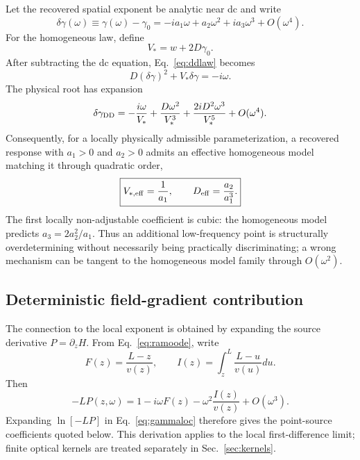 \documentclass[aps,pra,twocolumn,superscriptaddress,nofootinbib]{revtex4-2}
\newcommand{\Deff}{D_{\mathrm{eff}}}
\begin{document}
Let the recovered spatial exponent be analytic near dc and write
\begin{equation}
\delta\gamma(\omega)
\equiv\gamma(\omega)-\gamma_0
=-ia_1\omega+a_2\omega^2+ia_3\omega^3+O(\omega^4).
\label{eq:gammaexpansion}
\end{equation}
For the homogeneous law, define
\begin{equation}
V_*=w+2D\gamma_0.
\end{equation}
After subtracting the dc equation, Eq.~\eqref{eq:ddlaw} becomes
\begin{equation}
D(\delta\gamma)^2+V_*\delta\gamma=-i\omega.
\end{equation}
The physical root has expansion
\begin{equation}
\delta\gamma_{\rm DD}
=-\frac{i\omega}{V_*}
+\frac{D\omega^2}{V_*^3}
+\frac{2iD^2\omega^3}{V_*^5}
+O(\omega^4).
\label{eq:ddexpansion}
\end{equation}
Consequently, for a locally physically admissible parameterization, a recovered response with $a_1>0$ and $a_2>0$ admits an effective homogeneous model matching it through quadratic order,
\begin{equation}
\boxed{
V_{*,\rm eff}=\frac{1}{a_1},
\qquad
\Deff=\frac{a_2}{a_1^3}.
}
\label{eq:effectiveD}
\end{equation}
The first locally non-adjustable coefficient is cubic: the homogeneous model predicts $a_3=2a_2^2/a_1$. Thus an additional low-frequency point is structurally overdetermining without necessarily being practically discriminating; a wrong mechanism can be tangent to the homogeneous model family through $O(\omega^2)$.

\subsection{Deterministic field-gradient contribution}

The connection to the local exponent is obtained by expanding the source derivative $P=\partial_zH$.  From Eq.~\eqref{eq:ramoode}, write
\begin{equation}
F(z)=\frac{L-z}{v(z)},
\qquad
I(z)=\int_z^L\frac{L-u}{v(u)}du.
\end{equation}
Then
\begin{equation}
-LP(z,\omega)
=1-i\omega F(z)-\omega^2\frac{I(z)}{v(z)}+O(\omega^3).
\end{equation}
Expanding $\ln[-LP]$ in Eq.~\eqref{eq:gammaloc} therefore gives the point-source coefficients quoted below.  This derivation applies to the local first-difference limit; finite optical kernels are treated separately in Sec.~\ref{sec:kernels}.
\end{document}
